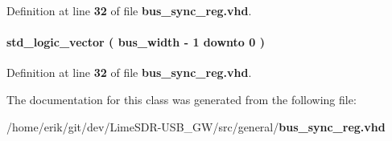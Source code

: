 Definition at line {\bf 32} of file {\bf bus\+\_\+sync\+\_\+reg.\+vhd}.

\paragraph[{sync\+\_\+reg1}]{ {\bfseries \textcolor{comment}{std\+\_\+logic\+\_\+vector}\textcolor{vhdlchar}{ }\textcolor{vhdlchar}{(}\textcolor{vhdlchar}{ }\textcolor{vhdlchar}{ }\textcolor{vhdlchar}{ }\textcolor{vhdlchar}{ }{\bfseries {\bf bus\+\_\+width}} \textcolor{vhdlchar}{-\/}\textcolor{vhdlchar}{ } \textcolor{vhdldigit}{1} \textcolor{vhdlchar}{ }\textcolor{keywordflow}{downto}\textcolor{vhdlchar}{ }\textcolor{vhdlchar}{ } \textcolor{vhdldigit}{0} \textcolor{vhdlchar}{ }\textcolor{vhdlchar}{)}\textcolor{vhdlchar}{ }} \hspace{0.3cm}{\ttfamily [Signal]}}\label{classbus__sync__reg_1_1arch_a6d8354df2886c09e625f28048c39618e}


Definition at line {\bf 32} of file {\bf bus\+\_\+sync\+\_\+reg.\+vhd}.



The documentation for this class was generated from the following file\+:\begin{DoxyCompactItemize}
\item 
/home/erik/git/dev/\+Lime\+S\+D\+R-\/\+U\+S\+B\+\_\+\+G\+W/src/general/{\bf bus\+\_\+sync\+\_\+reg.\+vhd}\end{DoxyCompactItemize}
